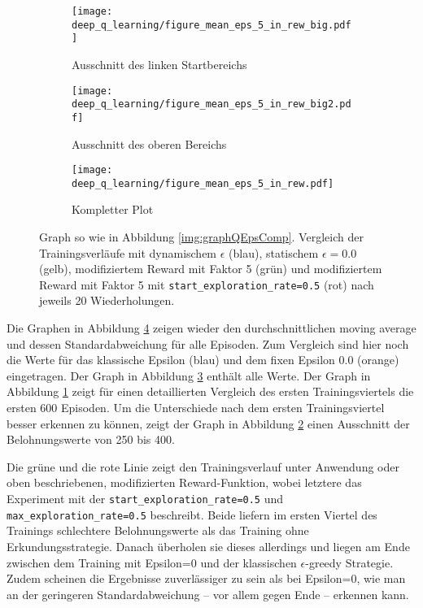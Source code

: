 \begin{figure}[h!]
    \centering
    \begin{subfigure}[b]{0.49\textwidth}
        \texttt{[image: deep\_q\_learning/figure\_mean\_eps\_5\_in\_rew\_big.pdf]}
        \caption{Ausschnitt des linken Startbereichs}
        \label{img:graphEps5InRewBig}
    \end{subfigure}
    \begin{subfigure}[b]{0.49\textwidth}
        \texttt{[image: deep\_q\_learning/figure\_mean\_eps\_5\_in\_rew\_big2.pdf]}
        \caption{Ausschnitt des oberen Bereichs}
        \label{img:graphEps5InRewBig2}
    \end{subfigure}
    \begin{subfigure}[b]{0.7\textwidth}
        \texttt{[image: deep\_q\_learning/figure\_mean\_eps\_5\_in\_rew.pdf]}
        \caption{Kompletter Plot}
        \label{img:graphEps5InRew}
    \end{subfigure}
    \caption{Graph so wie in Abbildung \ref{img:graphQEpsComp}. Vergleich der Trainingsverläufe mit dynamischem $ \epsilon $ (blau), statischem $ \epsilon = 0.0 $ (gelb), modifiziertem Reward mit Faktor 5 (grün) und modifiziertem Reward mit Faktor 5 mit \texttt{start_exploration_rate=0.5} (rot) nach jeweils 20 Wiederholungen.}
    \label{img:graphEps5InRewBoth}
\end{figure} 

Die Graphen in Abbildung \ref{img:graphEps5InRewBoth} zeigen wieder den durchschnittlichen moving average und dessen Standardabweichung für alle Episoden. Zum Vergleich sind hier noch die Werte für das klassische Epsilon (blau) und dem fixen Epsilon 0.0 (orange) eingetragen. Der Graph in Abbildung \ref{img:graphEps5InRew} enthält alle Werte. Der Graph in Abbildung \ref{img:graphEps5InRewBig} zeigt für einen detaillierten Vergleich des ersten Trainingsviertels die ersten 600 Episoden. Um die Unterschiede nach dem ersten Trainingsviertel besser erkennen zu können, zeigt der Graph in Abbildung \ref{img:graphEps5InRewBig2} einen Ausschnitt der Belohnungswerte von 250 bis 400.

Die grüne und die rote Linie zeigt den Trainingsverlauf unter Anwendung oder oben beschriebenen, modifizierten Reward-Funktion, wobei letztere das Experiment mit der \texttt{start_exploration_rate=0.5} und \texttt{max_exploration_rate=0.5} beschreibt. Beide liefern im ersten Viertel des Trainings schlechtere Belohnungswerte als das Training ohne Erkundungsstrategie. Danach überholen sie dieses allerdings und liegen am Ende zwischen dem Training mit Epsilon=0 und der klassischen $ \epsilon $-greedy Strategie. Zudem scheinen die Ergebnisse zuverlässiger zu sein als bei Epsilon=0, wie man an der geringeren Standardabweichung -- vor allem gegen Ende -- erkennen kann.

